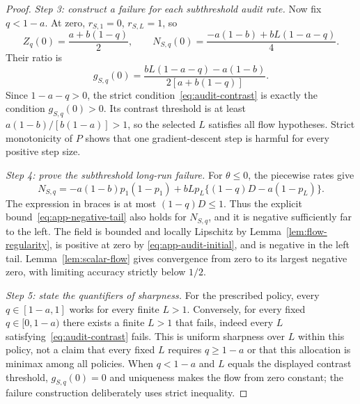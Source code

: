 \begin{proof}
\textit{Step 3: construct a failure for each subthreshold audit rate.}
Now fix $q<1-a$. At zero, $r_{S,1}=0$, $r_{S,L}=1$, so
\[
 Z_q(0)=\frac{a+b(1-q)}2,\qquad
 N_{S,q}(0)=\frac{-a(1-b)+bL(1-a-q)}4.
\]
Their ratio is
\begin{equation}
 g_{S,q}(0)=\frac{bL(1-a-q)-a(1-b)}{2[a+b(1-q)]}.
 \label{eq:app-audit-initial}
\end{equation}
Since $1-a-q>0$, the strict condition~\eqref{eq:audit-contrast} is exactly
the condition $g_{S,q}(0)>0$. Its contrast threshold is at least
$a(1-b)/[b(1-a)]>1$, so the selected $L$ satisfies all flow hypotheses.
Strict monotonicity of $P$ shows that one gradient-descent step is harmful
for every positive step size.

\textit{Step 4: prove the subthreshold long-run failure.}
For $\theta\leq0$, the piecewise rates give
\[
 N_{S,q}=-a(1-b)p_1(1-p_1)
        +bL p_L\{(1-q)D-a(1-p_L)\}.
\]
The expression in braces is at most $(1-q)D\leq1$. Thus the explicit
bound~\eqref{eq:app-negative-tail} also holds for $N_{S,q}$, and it is
negative sufficiently far to the left. The field is bounded and locally
Lipschitz by Lemma~\ref{lem:flow-regularity}, is positive at zero by
\eqref{eq:app-audit-initial}, and is negative in the left tail.
Lemma~\ref{lem:scalar-flow} gives convergence from zero to its largest
negative zero, with limiting accuracy strictly below $1/2$.

\textit{Step 5: state the quantifiers of sharpness.}
For the prescribed policy, every $q\in[1-a,1]$ works for every finite
$L>1$. Conversely, for every fixed $q\in[0,1-a)$ there exists a finite
$L>1$ that fails, indeed every $L$ satisfying~\eqref{eq:audit-contrast}
fails. This is uniform sharpness over $L$ within this policy, not a claim
that every fixed $L$ requires $q\geq1-a$ or that this allocation is
minimax among all policies. When $q<1-a$ and $L$ equals the displayed
contrast threshold, $g_{S,q}(0)=0$ and uniqueness makes the flow from
zero constant; the failure construction deliberately uses strict inequality.
\end{proof}

